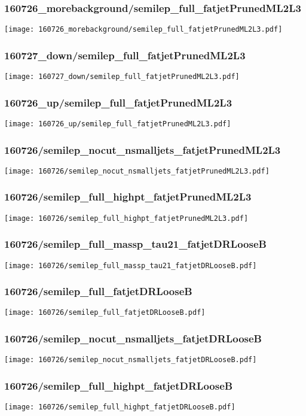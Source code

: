 \begin{frame}
   \frametitle{\small 160726\_morebackground/semilep\_full\_fatjetPrunedML2L3}
   \centering
   \texttt{[image: 160726\_morebackground/semilep\_full\_fatjetPrunedML2L3.pdf]}
\end{frame}

\begin{frame}
   \frametitle{\small 160727\_down/semilep\_full\_fatjetPrunedML2L3}
   \centering
   \texttt{[image: 160727\_down/semilep\_full\_fatjetPrunedML2L3.pdf]}
\end{frame}

\begin{frame}
   \frametitle{\small 160726\_up/semilep\_full\_fatjetPrunedML2L3}
   \centering
   \texttt{[image: 160726\_up/semilep\_full\_fatjetPrunedML2L3.pdf]}
\end{frame}

\begin{frame}
   \frametitle{\small 160726/semilep\_nocut\_nsmalljets\_fatjetPrunedML2L3}
   \centering
   \texttt{[image: 160726/semilep\_nocut\_nsmalljets\_fatjetPrunedML2L3.pdf]}
\end{frame}

\begin{frame}
   \frametitle{\small 160726/semilep\_full\_highpt\_fatjetPrunedML2L3}
   \centering
   \texttt{[image: 160726/semilep\_full\_highpt\_fatjetPrunedML2L3.pdf]}
\end{frame}

\begin{frame}
   \frametitle{\small 160726/semilep\_full\_massp\_tau21\_fatjetDRLooseB}
   \centering
   \texttt{[image: 160726/semilep\_full\_massp\_tau21\_fatjetDRLooseB.pdf]}
\end{frame}

\begin{frame}
   \frametitle{\small 160726/semilep\_full\_fatjetDRLooseB}
   \centering
   \texttt{[image: 160726/semilep\_full\_fatjetDRLooseB.pdf]}
\end{frame}

\begin{frame}
   \frametitle{\small 160726/semilep\_nocut\_nsmalljets\_fatjetDRLooseB}
   \centering
   \texttt{[image: 160726/semilep\_nocut\_nsmalljets\_fatjetDRLooseB.pdf]}
\end{frame}

\begin{frame}
   \frametitle{\small 160726/semilep\_full\_highpt\_fatjetDRLooseB}
   \centering
   \texttt{[image: 160726/semilep\_full\_highpt\_fatjetDRLooseB.pdf]}
\end{frame}

